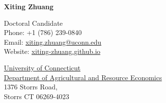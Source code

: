 \documentclass[10.5 pt,letterpaper]{article}
\def\name{Xiting Zhuang}
\begin{document}
	
	{\huge \textbf{\name}}
	
	
	\vspace{0.25in}
	
	\begin{minipage}[t]{0.45\textwidth}
		Doctoral Candidate \\
		Phone: +1 (786) 239-0840 \\
		Email: \href{mailto:xiting.zhuang@uconn.edu}{xiting.zhuang@uconn.edu} \\
		Website: \href{https://xiting-zhuang.github.io}{xiting-zhuang.github.io} \\
		
	\end{minipage}
	\begin{minipage}[t]{0.6\textwidth}
		\href{https://uconn.edu/}{University of Connecticut} \\
		\href{https://are.uconn.edu/}{Department of Agricultural and Resource Economics} \\
		1376 Storrs Road,  	\\
		Storrs CT 06269-4023 
	\end{minipage}
	
\end{document}
